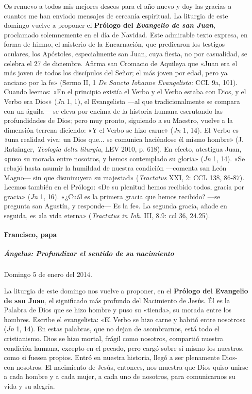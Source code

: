 \documentclass[]{article}
\let\oldparagraph\paragraph
\renewcommand{\paragraph}[1]{\oldparagraph{#1}\mbox{}}
\let\oldsubparagraph\subparagraph
\renewcommand{\subparagraph}[1]{\oldsubparagraph{#1}\mbox{}}
\begin{document}
Os renuevo a todos mis mejores deseos para el año nuevo y doy las
gracias a cuantos me han enviado mensajes de cercanía espiritual. La
liturgia de este domingo vuelve a proponer el \textbf{Prólogo del
\emph{Evangelio de san Juan}}, proclamado solemnemente en el día de
Navidad. Este admirable texto expresa, en forma de himno, el misterio de
la Encarnación, que predicaron los testigos oculares, los Apóstoles,
especialmente san Juan, cuya fiesta, no por casualidad, se celebra el 27
de diciembre. Afirma san Cromacio de Aquileya que «Juan era el más joven
de todos los discípulos del Señor; el más joven por edad, pero ya
anciano por la fe» (Sermo II, 1 \emph{De Sancto Iohanne Evangelista:}
CCL 9a, 101). Cuando leemos: «En el principio existía el Verbo y el
Verbo estaba con Dios, y el Verbo era Dios» (\emph{Jn} 1, 1), el
Evangelista ---al que tradicionalmente se compara con un águila--- se
eleva por encima de la historia humana escrutando las profundidades de
Dios; pero muy pronto, siguiendo a su Maestro, vuelve a la dimensión
terrena diciendo: «Y el Verbo se hizo carne» (\emph{Jn} 1, 14). El Verbo
es «una realidad viva: un Dios que... se comunica haciéndose él mismo
hombre» (J. Ratzinger, \emph{Teologia della liturgia}, LEV 2010, p.
618). En efecto, atestigua Juan, «puso su morada entre nosotros, y hemos
contemplado su gloria» (\emph{Jn} 1, 14). «Se rebajó hasta asumir la
humildad de nuestra condición ---comenta san León Magno--- sin que
disminuyera su majestad» (\emph{Tractatus} XXI, 2: CCL 138, 86-87).
Leemos también en el Prólogo: «De su plenitud hemos recibido todos,
gracia por gracia» (\emph{Jn} 1, 16). «¿Cuál es la primera gracia que
hemos recibido? ---se pregunta san Agustín, y responde--- Es la fe». La
segunda gracia, añade en seguida, es «la vida eterna» (\emph{Tractatus
in Ioh.} III, 8.9: ccl 36, 24.25).

\paragraph{Francisco, papa}\label{francisco-papa-7}

\subparagraph{Ángelus: Profundizar el sentido de su
nacimiento}\label{uxe1ngelus-profundizar-el-sentido-de-su-nacimiento}

Domingo 5 de enero del 2014.

La liturgia de este domingo nos vuelve a proponer, en el \textbf{Prólogo
del Evangelio de san Juan}, el significado más profundo del Nacimiento
de Jesús. Él es la Palabra de Dios que se hizo hombre y puso su
«tienda», su morada entre los hombres. Escribe el evangelista: «El Verbo
se hizo carne y habitó entre nosotros» (\emph{Jn} 1, 14). En estas
palabras, que no dejan de asombrarnos, está todo el cristianismo. Dios
se hizo mortal, frágil como nosotros, compartió nuestra condición
humana, excepto en el pecado, pero cargó sobre sí mismo los nuestros,
como si fuesen propios. Entró en nuestra historia, llegó a ser
plenamente Dios-con-nosotros. El nacimiento de Jesús, entonces, nos
muestra que Dios quiso unirse a cada hombre y a cada mujer, a cada uno
de nosotros, para comunicarnos su vida y su alegría.
\end{document}
